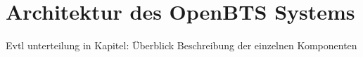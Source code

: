 \section{Architektur des OpenBTS Systems}
Evtl unterteilung in Kapitel:
Überblick
Beschreibung der einzelnen Komponenten